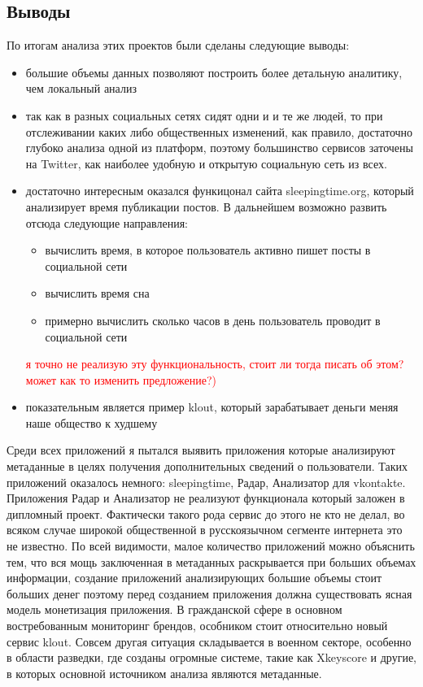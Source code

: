 \subsection{Выводы}
По итогам анализа этих проектов были сделаны следующие выводы:
\begin{itemize}
\item большие объемы данных позволяют построить более детальную аналитику, чем локальный анализ
\item так как в разных социальных сетях сидят одни и и те же людей, то при отслеживании каких либо общественных изменений, как правило, достаточно глубоко анализа одной из платформ, поэтому большинство сервисов заточены на Twitter, как наиболее удобную и открытую социальную сеть из всех.
\item достаточно интересным оказался функицонал сайта  sleepingtime.org, который анализирует время публикации постов. В дальнейшем возможно развить отсюда следующие направления:
	\begin{itemize}
	\item вычислить время, в которое пользователь активно пишет посты в социальной сети
	\item вычислить время сна
	\item примерно вычислить сколько часов в день пользователь проводит в социальной сети
	\end{itemize}
\textcolor{red}{я точно не реализую эту функциональность, стоит ли тогда писать об этом? может как то изменить предложение?)}
\item показательным является пример klout, который зарабатывает деньги меняя наше общество к худшему
\end{itemize}
Среди всех приложений я пытался выявить приложения которые анализируют метаданные в целях получения дополнительных сведений о пользователи. Таких приложений оказалось немного: sleepingtime, Радар, Анализатор для vkontakte. Приложения Радар и Анализатор не реализуют функционала который заложен в дипломный проект. Фактически такого рода сервис до этого не кто не делал, во всяком случае широкой общественной в русскоязычном сегменте интернета это не известно. По всей видимости,  малое количество приложений можно объяснить тем, что вся мощь заключенная в метаданных раскрывается при больших объемах информации, создание приложений анализирующих большие объемы стоит больших денег поэтому перед созданием приложения должна существовать ясная модель монетизация приложения. В гражданской сфере в основном востребованным мониторинг брендов, особником стоит относительно новый сервис klout. Совсем другая ситуация складывается в военном секторе, особенно в области разведки, где созданы огромные системе, такие как Xkeyscore и другие, в которых основной источником анализа являются метаданные.  %

